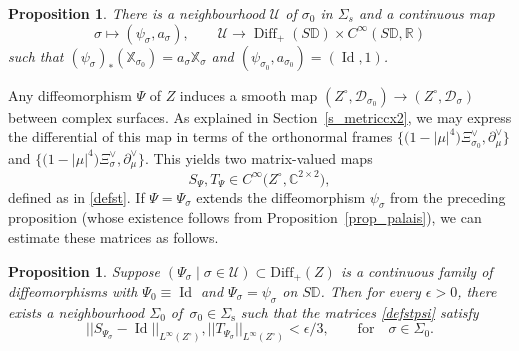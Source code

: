 \documentclass[pdftex]{sigma}
\numberwithin{equation}{section}
\newtheorem{Proposition}[Theorem]{Proposition}
\theoremstyle{definition}
\newcommand{\R}{\mathbb{R}} %
\newcommand{\C}{\mathbb{C}} %
\newcommand{\DD}{\mathbb{D}} %
\newcommand{\1}{{\bf 1}}
\newcommand{\Id}{\operatorname{Id}}
\newcommand{\D}{\mathscr{D}}
\DeclareMathOperator{\Diff}{Diff}
\begin{document}
\begin{Proposition}\label{flowback} There is a neighbourhood $\mathcal U$ of $\sigma_0$ in $\Sigma_s$ and a continuous map
\[
	\sigma \mapsto (\psi_\sigma,a_\sigma),\qquad \mathcal U\rightarrow \Diff_+(S\DD)\times C^\infty(S\DD,\R)
\]
such that $(\psi_\sigma)_*(\mathbb X_{\sigma_0})=a_\sigma \mathbb X_\sigma$ and $(\psi_{\sigma_0},a_{\sigma_0})=(\Id,1)$.
\end{Proposition}
Any diffeomorphism $\Psi$ of $Z$ induces a smooth map $(Z^\circ,\D_{\sigma_0})\rightarrow (Z^\circ,\D_\sigma)$ between complex surfaces. As explained in Section~\ref{s_metriccx2}, we may express the differential of this map in terms of the orthonormal frames $\big\{\bigl(1-|\mu|^4\bigr) \Xi_{\sigma_0}^\vee,\partial_\mu^\vee\big\}$ and $\big\{\bigl(1-|\mu|^4\bigr) \Xi_\sigma^\vee,\partial_\mu^\vee\big\}$. This yields two matrix-valued maps
\begin{equation}\label{defstpsi}
S_\Psi,T_\Psi\in C^\infty\bigl(Z^\circ,\C^{2\times 2}\bigr),
\end{equation}
defined as in \eqref{defst}. If $\Psi=\Psi_\sigma$ extends the diffeomorphism $\psi_\sigma$ from the preceding proposition (whose existence follows from Proposition~\ref{prop_palais}), we can estimate these matrices as follows.


\begin{Proposition}\label{STestimate} Suppose $(\Psi_\sigma\mid \sigma\in \mathcal U)\subset \mathrm{Diff}_+ (Z)$ is a continuous family of diffeomorphisms with $\Psi_0\equiv \Id$ and $\Psi_\sigma=\psi_\sigma$ on $S\DD$. Then for every $\epsilon >0$, there exists a neighbourhood $\Sigma_0$ of~$\sigma_0\in \Sigma_\mathrm{s}$ such that the matrices \eqref{defstpsi} satisfy
\begin{equation*}
|| S_{\Psi_\sigma} - \Id ||_{L^\infty(Z^\circ)}, || T_{\Psi_\sigma} ||_{L^\infty(Z^\circ)} <\epsilon/3,\qquad \text{for}\quad \sigma \in \Sigma_0.
\end{equation*}
\end{Proposition}
\end{document}

